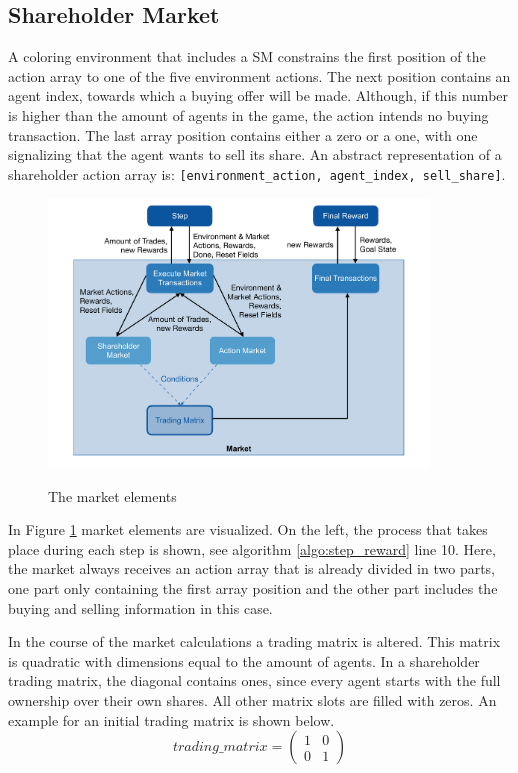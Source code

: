 \subsection{Shareholder Market}
A coloring environment that includes a SM constrains the first position of the action array to one of the five environment actions. The next position contains an agent index, towards which a buying offer will be made. Although, if this number is higher than the amount of agents in the game, the action intends no buying transaction. The last array position contains either a zero or a one, with one signalizing that the agent wants to sell its share. An abstract representation of a shareholder action array is: \verb|[environment_action, agent_index, sell_share]|.

\begin{figure}[hpbt]
    \centering
    \includegraphics[width=0.9\textwidth]{pictures/market}\\
    \caption[Market Elements]{The market elements}\label{fig:market}
\end{figure}

In Figure \ref{fig:market} market elements are visualized. On the left, the process that takes place during each step is shown, see algorithm \ref{algo:step_reward} line 10. Here, the market always receives an action array that is already divided in two parts, one part only containing the first array position and the other part includes the buying and selling information in this case.

In the course of the market calculations a trading matrix is altered. This matrix is quadratic with dimensions equal to the amount of agents. In a shareholder trading matrix, the diagonal contains ones, since every agent starts with the full ownership over their own shares. All other matrix slots are filled with zeros. An example for an initial trading matrix is shown below.
\begin{equation*}
trading\_matrix = 
\begin{pmatrix}
1 & 0 \\
0 & 1
\end{pmatrix}
\end{equation*}

